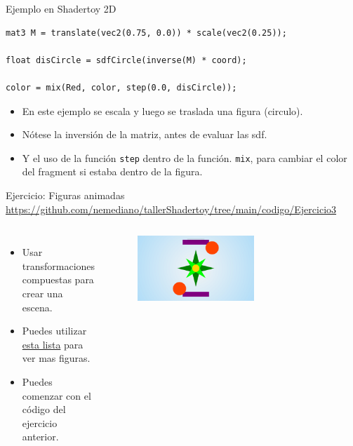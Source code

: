 \begin{frame}[fragile]{Ejemplo en Shadertoy 2D}
\begin{listing}
\begin{verbatim}
mat3 M = translate(vec2(0.75, 0.0)) * scale(vec2(0.25));

float disCircle = sdfCircle(inverse(M) * coord);

color = mix(Red, color, step(0.0, disCircle));
\end{verbatim}
\end{listing}
\begin{itemize}
    \item En este ejemplo se escala y luego se traslada una figura (circulo).
    \item Nótese la inversión de la matriz, antes de evaluar las sdf.
    \item Y el uso de la función \texttt{step} dentro de la función. \texttt{mix}, para cambiar el color del fragment si estaba dentro de la figura.
\end{itemize}
\end{frame}

\begin{frame}{Ejercicio: Figuras animadas}
\url{https://github.com/nemediano/tallerShadertoy/tree/main/codigo/Ejercicio3}
\begin{columns}
     \begin{itemize}
         \item Usar transformaciones compuestas para crear una escena.
         \item Puedes utilizar \href{https://iquilezles.org/articles/distfunctions2d/}{esta lista} para ver mas figuras.
         \item Puedes comenzar con el código del ejercicio anterior.
     \end{itemize}
        \begin{figure}[htb]
            \centering
            \includegraphics[width=0.6\textwidth]{img/Ejer/Ejer3}
        \end{figure}
\end{columns}
\end{frame}
